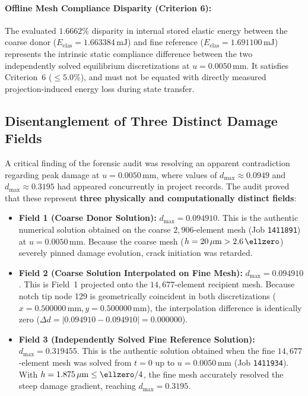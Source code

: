 \begin{enumerate}
\paragraph{Offline Mesh Compliance Disparity (Criterion 6):}
The evaluated $1.6662\%$ disparity in internal stored elastic energy between the coarse donor ($E_{\mathrm{elas}} = 1.663384\,\mathrm{mJ}$) and fine reference ($E_{\mathrm{elas}} = 1.691100\,\mathrm{mJ}$) represents the intrinsic static compliance difference between the two independently solved equilibrium discretizations at $u = 0.0050\,\mathrm{mm}$. It satisfies Criterion~6 ($\le 5.0\%$), and must not be equated with directly measured projection-induced energy loss during state transfer.

\subsection{Disentanglement of Three Distinct Damage Fields}
\label{subsec:method_c_three_damage_fields}

A critical finding of the forensic audit was resolving an apparent contradiction regarding peak damage at $u = 0.0050\,\mathrm{mm}$, where values of $d_{\max} \approx 0.0949$ and $d_{\max} \approx 0.3195$ had appeared concurrently in project records. The audit proved that these represent \textbf{three physically and computationally distinct fields}:
\begin{itemize}
  \item \textbf{Field 1 (Coarse Donor Solution):} $d_{\max} = 0.094910$. This is the authentic numerical solution obtained on the coarse $2{,}906$-element mesh (Job \texttt{1411891}) at $u = 0.0050\,\mathrm{mm}$. Because the coarse mesh ($h = 20\,\mu\mathrm{m} > 2.6\,\ellzero$) severely pinned damage evolution, crack initiation was retarded.
  \item \textbf{Field 2 (Coarse Solution Interpolated on Fine Mesh):} $d_{\max} = 0.094910$. This is Field~1 projected onto the $14{,}677$-element recipient mesh. Because notch tip node 129 is geometrically coincident in both discretizations ($x = 0.500000\,\mathrm{mm}, y = 0.500000\,\mathrm{mm}$), the interpolation difference is identically zero ($\Delta d = |0.094910 - 0.094910| = 0.000000$).
  \item \textbf{Field 3 (Independently Solved Fine Reference Solution):} $d_{\max} = 0.319455$. This is the authentic solution obtained when the fine $14{,}677$-element mesh was solved from $t = 0$ up to $u = 0.0050\,\mathrm{mm}$ (Job \texttt{1411934}). With $h = 1.875\,\mu\mathrm{m} \le \ellzero / 4$, the fine mesh accurately resolved the steep damage gradient, reaching $d_{\max} = 0.3195$.
\end{itemize}


\end{enumerate}
